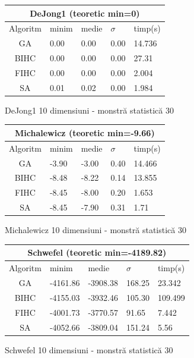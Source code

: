 \documentclass{article}
\begin{document}
\begin{figure}[!h]
\begin{tabular}{||c|||l|l|l|l||}
  \hline
  \multicolumn{5}{||c||}{DeJong1 (teoretic min=0)} \\ \hline
  Algoritm & minim & medie & $\sigma$ & timp(s) \\ \hline \hline
  GA & 0.00 & 0.00 & 0.00 & 14.736 \\ \hline
  BIHC & 0.00 & 0.00 & 0.00 & 27.31\\ \hline
  FIHC & 0.00 & 0.00 & 0.00 & 2.004 \\ \hline
  SA & 0.01 & 0.02 & 0.00 & 1.984 \\ \hline
\end{tabular}
\caption{DeJong1 10 dimensiuni - monstră statistică 30} 
\end{figure}

\begin{figure}[!h]
\begin{tabular}{||c|||l|l|l|l||}
  \hline
  \multicolumn{5}{||c||}{Michalewicz (teoretic min=-9.66)} \\ \hline
  Algoritm & minim & medie & $\sigma$ & timp(s) \\ \hline \hline
  GA & -3.90 & -3.00 & 0.40 & 14.466 \\ \hline
  BIHC & -8.48 & -8.22 & 0.14 & 13.855\\ \hline
  FIHC & -8.45 & -8.00 & 0.20 & 1.653 \\ \hline
  SA & -8.45 & -7.90 & 0.31 & 1.71 \\ \hline
\end{tabular}
\caption{Michalewicz 10 dimensiuni - monstră statistică 30} 
\end{figure}

\begin{figure}[!h]
\begin{tabular}{||c|||l|l|l|l||}
  \hline
  \multicolumn{5}{||c||}{Schwefel (teoretic min=-4189.82)} \\ \hline
  Algoritm & minim & medie & $\sigma$ & timp(s) \\ \hline \hline
  GA & -4161.86 & -3908.38 & 168.25 & 23.342 \\ \hline
  BIHC & -4155.03 & -3932.46 & 105.30 & 109.499\\ \hline
  FIHC & -4001.73 & -3770.57 & 91.65 & 7.442 \\ \hline
  SA & -4052.66 & -3809.04 & 151.24 & 5.56 \\ \hline
\end{tabular}
\caption{Schwefel 10 dimensiuni - monstră statistică 30} 
\end{figure}
\end{document}
